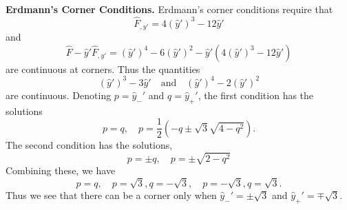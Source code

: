 \begin{Solution}
\begin{description}
    \textbf{Erdmann's Corner Conditions.}
    Erdmann's corner conditions require that 
    \[
    \hat{F}_{,y'} = 4 (\hat{y}')^3 - 12 \hat{y}'
    \]
    and
    \[
    \hat{F} - \hat{y}' \hat{F}_{,y'} = (\hat{y}')^4 - 6 (\hat{y}')^2
    - \hat{y}'(4 (\hat{y}')^3 - 12 \hat{y}')
    \]
    are continuous at corners.  Thus the quantities
    \[
    (\hat{y}')^3 - 3 \hat{y}' \quad \mathrm{and} \quad
    (\hat{y}')^4 - 2 (\hat{y}')^2
    \]
    are continuous.  Denoting $p = \hat{y}_-'$ and $q = \hat{y}_+'$, the first 
    condition has the solutions
    \[
    p = q, \quad p = \frac{1}{2} \left( -q \pm \sqrt{3} \sqrt{4-q^2} \right).
    \]
    The second condition has the solutions,
    \[
    p = \pm q, \quad p = \pm \sqrt{2-q^2}
    \]
    Combining these, we have
    \[
    p = q, \quad p = \sqrt{3},q = -\sqrt{3}, \quad p = -\sqrt{3},q = \sqrt{3}.
    \]
    Thus we see that there can be a corner only when $\hat{y}_-' = \pm \sqrt{3}$
    and $\hat{y}_+' = \mp \sqrt{3}$.

    \begin{center}
    \end{center}
  \end{description}
\end{Solution}


